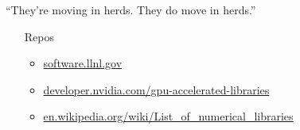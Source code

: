\documentclass[xcolor={svgnames,usenames}]{beamer}
\begin{document}
\begin{frame}{``They're moving in herds. They do move in herds.''}
{\begin{itemize}
\begin{itemize}
		\item \texttt{MUMPS}: \href{http://mumps.enseeiht.fr/}{mumps.enseeiht.fr/}
		\item \texttt{Trilinos}: \href{https://trilinos.github.io/}{trilinos.github.io/}
		\item \texttt{SUNDIALS}: \href{https://computing.llnl.gov/projects/sundials}{computing.llnl.gov/projects/sundials}
	\end{itemize}
\item[Repos]
\begin{itemize}
	\item \href{https://software.llnl.gov}{software.llnl.gov}
	\item \href{https://developer.nvidia.com/gpu-accelerated-libraries}{developer.nvidia.com/gpu-accelerated-libraries}
	\item \href{https://en.wikipedia.org/wiki/List_of_numerical_libraries}{en.wikipedia.org/wiki/List\_of\_numerical\_libraries}
\end{itemize}
\end{itemize}
}
\end{frame}
\end{document}
